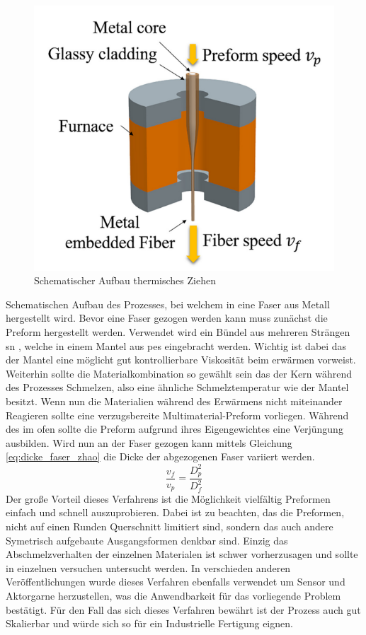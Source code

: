 \begin{figure}
\includegraphics[width=0.9\linewidth]{Abbildungen/Schematic_of_thermal_fiber_drawing.png} 
\caption{Schematischer Aufbau thermisches Ziehen \cite{Zhao.2016}}
\label{fig:thermal_fiber_drawing}
\end{figure}

Schematischen Aufbau des Prozesses, bei welchem in  eine Faser aus Metall hergestellt wird. Bevor eine Faser gezogen werden kann muss zunächst die Preform hergestellt werden. Verwendet wird ein Bündel aus mehreren Strängen \ac{sn} , welche in einem Mantel aus \ac{pes} eingebracht werden. Wichtig ist dabei das der Mantel eine möglicht gut kontrollierbare Viskosität beim erwärmen vorweist. Weiterhin sollte die Materialkombination so gewählt sein das der Kern während des Prozesses Schmelzen, also eine ähnliche Schmelztemperatur wie der Mantel besitzt. Wenn nun die Materialien während des Erwärmens nicht miteinander Reagieren sollte eine verzugsbereite Multimaterial-Preform vorliegen. Während des  im ofen sollte die Preform aufgrund ihres Eigengewichtes eine Verjüngung ausbilden. Wird nun an der Faser gezogen kann mittels Gleichung \ref{eq:dicke_faser_zhao} die Dicke der abgezogenen Faser variiert werden\cite{Zhao.2016}.
\begin{equation}
    \frac{v_f}{v_p} = \frac{D_p^2}{D_f^2} 
    \label{eq:dicke_faser_zhao}
\end{equation}
Der große Vorteil dieses Verfahrens ist die Möglichkeit vielfältig Preformen einfach und schnell auszuprobieren. Dabei ist zu beachten, das die Preformen, nicht auf einen Runden Querschnitt limitiert sind, sondern das auch andere Symetrisch aufgebaute Ausgangsformen denkbar sind. Einzig das Abschmelzverhalten der einzelnen Materialen ist schwer vorherzusagen und sollte in einzelnen versuchen untersucht werden. 
In verschieden anderen Veröffentlichungen wurde dieses Verfahren ebenfalls verwendet um Sensor und Aktorgarne herzustellen, was die Anwendbarkeit für das vorliegende Problem bestätigt\cite{Kanik.2019}\cite{Leber.2023}.
Für den Fall das sich dieses Verfahren bewährt ist der Prozess auch gut Skalierbar und würde sich so für ein Industrielle Fertigung eignen.
